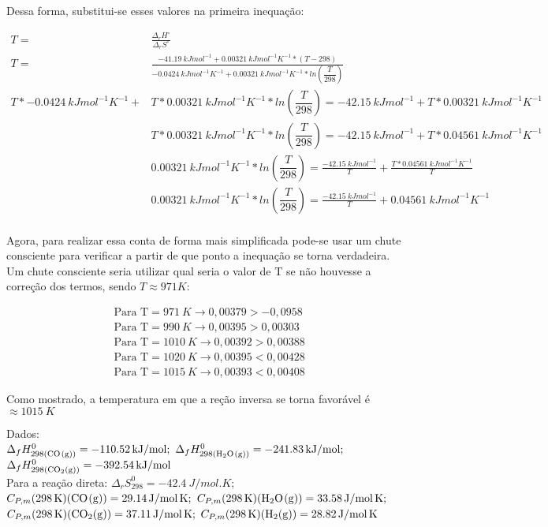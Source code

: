 Dessa forma, substitui-se esses valores na primeira inequação:

\begin{align*}
	T = &\frac{\Delta_rH^\circ}{\Delta_rS^\circ}\\ 
	T = &\frac{\qty{-41,19}{kJmol^{-1}} +\qty{0,00321}{kJmol^{-1}K^{-1}} *  (T - 298)}{\qty{-0,0424}{kJmol^{-1}K^{-1}} +\qty{0,00321}{kJmol^{-1}K^{-1}} * ln (\dfrac{T}{298})} \\  
	T * \qty{-0,0424}{kJmol^{-1}K^{-1}} + &T * \qty{0,00321}{kJmol^{-1}K^{-1}} *  ln (\dfrac{T}{298}) = \qty{-42,15}{kJmol^{-1}} + T * \qty{0,00321}{kJmol^{-1}K^{-1}} \\
	   &T * \qty{0,00321}{kJmol^{-1}K^{-1}} *  ln (\dfrac{T}{298}) = \qty{-42,15}{kJmol^{-1}} + T * \qty{0,04561}{kJmol^{-1}K^{-1}}\\
	&   \qty{0,00321}{kJmol^{-1}K^{-1}} * ln (\dfrac{T}{298}) = \frac{\qty{-42,15}{kJmol^{-1}}}{T}  + \frac{T * \qty{0,04561}{kJmol^{-1}K^{-1}}}{T} \\
	&   \qty{0,00321}{kJmol^{-1}K^{-1}} * ln (\dfrac{T}{298}) = \frac{\qty{-42,15}{kJmol^{-1}}}{T}  + \qty{0,04561}{kJmol^{-1}K^{-1}} \\
\end{align*}

 Agora, para realizar essa conta de forma mais simplificada pode-se usar um chute consciente para verificar a partir de que ponto a inequação se torna verdadeira. Um chute consciente seria utilizar qual seria o valor de T se não houvesse a correção dos termos, sendo \(T \approx 971 K\):
 
 \begin{align*}
 	&\text{Para T} = \qty{971}{K} \rightarrow 0,00379 > -0,0958 \\
 	&\text{Para T} = \qty{990}{K} \rightarrow 0,00395 > 0,00303 \\
 	&\text{Para T} = \qty{1010}{K} \rightarrow 0,00392 > 0,00388 \\
 	&\text{Para T} = \qty{1020}{K} \rightarrow 0,00395 < 0,00428 \\
 	&\text{Para T} = \qty{1015}{K} \rightarrow 0,00393 < 0,00408 
 \end{align*}
 
 Como mostrado, a temperatura em que a reção inversa se torna favorável é $\approx \qty{1015}{K}$ 
  
\noindent Dados:\\
\( \Delta_f H^0_{298(\ce{CO(g)})} = \qty{-110.52}{kJ \per mol};\) 
\( \Delta_f H^0_{298(\ce{H2O(g)})} = \qty{-241.83}{kJ \per mol};\) 
\( \Delta_f H^0_{298(\ce{CO2(g)})} = \qty{-392.54}{kJ \per mol}\) \\
Para a reação direta: \( \Delta _r S^0_{298} = \qty{-42.4}{J \per mol . K} \);\\
\(C_{P,m} (\qty{298}{K}) (\ce{CO(g)}) = \qty{29.14}{J \per mol . K}; \)
\(C_{P,m} (\qty{298}{K}) (\ce{H2O(g)}) = \qty{33.58}{J \per mol . K}; \)\\
\(C_{P,m} (\qty{298}{K}) (\ce{CO2(g)}) = \qty{37.11}{J \per mol . K}; \)
\(C_{P,m} (\qty{298}{K}) (\ce{H2(g)}) = \qty{28.82}{J \per mol . K} \)
